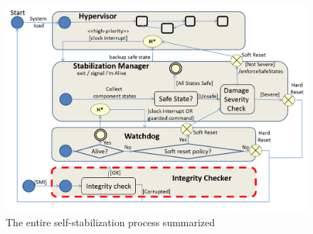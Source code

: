\begin{figure}
\begin{centering}
\includegraphics[width=12cm]{pictures/state-machine-selfstab}
\par\end{centering}

\caption{\label{fig:The-entire-self-stabilization-logic}The entire self-stabilization
process summarized }
\end{figure}

